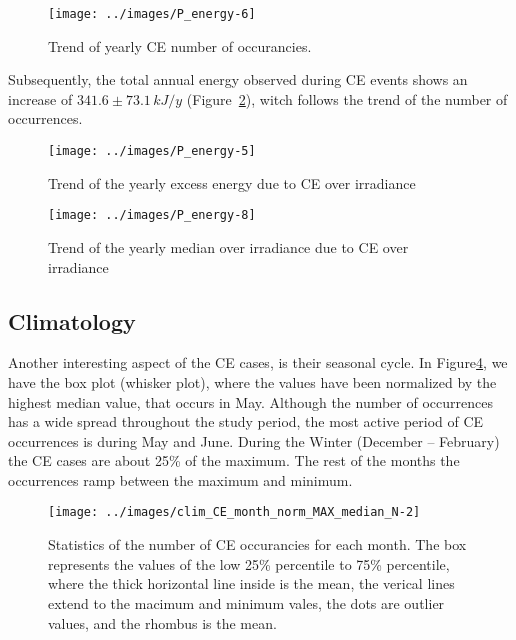 \documentclass[
]{article}
\begin{document}
\begin{figure}[h!]

{\centering \texttt{[image: ../images/P\_energy-6]} 

}

\caption{Trend of yearly CE number of occurancies.}\label{fig:P-energy-N}
\end{figure}

Subsequently, the total annual energy observed during CE events shows an increase of
\(341.6\pm 73.1\,kJ/y\)
(Figure~\ref{fig:P-energy-sum}), witch follows the trend of the number of
occurrences.

\begin{figure}[h!]

{\centering \texttt{[image: ../images/P\_energy-5]} 

}

\caption{Trend of the yearly excess energy due to CE over irradiance}\label{fig:P-energy-sum}
\end{figure}

\begin{figure}[h!]

{\centering \texttt{[image: ../images/P\_energy-8]} 

}

\caption{Trend of the yearly median over irradiance due to CE over irradiance}\label{fig:P-energy-median}
\end{figure}

\FloatBarrier

\hypertarget{climatology}{%
\subsection{Climatology}\label{climatology}}

Another interesting aspect of the CE cases, is their seasonal cycle. In
Figure\nobreakspace{}\ref{fig:relative-month-occurancies}, we have the box plot
(whisker plot), where the values have been normalized by the highest median value,
that occurs in May. Although the number of occurrences has a wide spread throughout
the study period, the most active period of CE occurrences is during May and June.
During the Winter (December -- February) the CE cases are about 25\% of the maximum.
The rest of the months the occurrences ramp between the maximum and minimum.

\begin{figure}[h!]

{\centering \texttt{[image: ../images/clim\_CE\_month\_norm\_MAX\_median\_N-2]} 

}

\caption{Statistics of the number of CE occurancies for each month. The box represents the values of the low 25\% percentile to 75\% percentile, where the thick horizontal line inside is the mean, the verical lines extend to the macimum and minimum vales, the dots are outlier values, and the rhombus is the mean.}\label{fig:relative-month-occurancies}
\end{figure}
\end{document}
